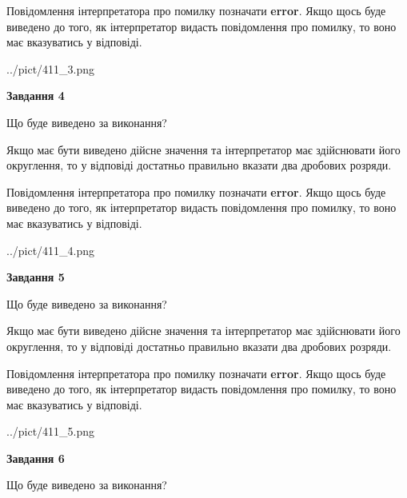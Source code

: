 \documentclass[12pt, ukrainian]{article}
\begin{document}
{\begin {Large}
Повідомлення інтерпретатора про помилку позначати \textbf{error}.
Якщо щось буде виведено до того, як інтерпретатор видасть повідомлення про помилку, 
то воно має вказуватись у відповіді. \par

\begin{center}
	{../pict/411_3.png}
\end{center}
\newpage

{\begin {center}\textbf{Завдання 4}\end {center}}\par
Що буде виведено за виконання? \par

Якщо має бути виведено дійсне значення та інтерпретатор має здійснювати його округлення, 
то у відповіді достатньо правильно вказати два дробових розряди.

Повідомлення інтерпретатора про помилку позначати \textbf{error}.
Якщо щось буде виведено до того, як інтерпретатор видасть повідомлення про помилку, 
то воно має вказуватись у відповіді. \par

\begin{center}
	{../pict/411_4.png}
\end{center}
\newpage

{\begin {center}\textbf{Завдання 5}\end {center}}\par
Що буде виведено за виконання? \par

Якщо має бути виведено дійсне значення та інтерпретатор має здійснювати його округлення, 
то у відповіді достатньо правильно вказати два дробових розряди.

Повідомлення інтерпретатора про помилку позначати \textbf{error}.
Якщо щось буде виведено до того, як інтерпретатор видасть повідомлення про помилку, 
то воно має вказуватись у відповіді. \par

\begin{center}
	{../pict/411_5.png}
\end{center}
\newpage

{\begin {center}\textbf{Завдання 6}\end {center}}\par
Що буде виведено за виконання? \par


\end{Large}}
\end{document}
